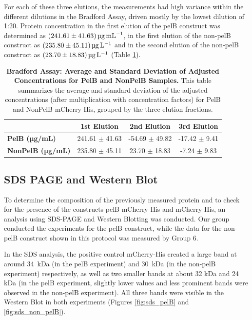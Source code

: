 \documentclass[a4paper,12pt]{article}
\begin{document}
For each of these three elutions, the measurements had high variance within the different dilutions in the Bradford Assay, driven mostly by the lowest dilution of 1:20. Protein concentration in the first elution of the pelB construct was determined as $\SI{241.61\pm 41.63}{\micro\gram\per\milli\liter}$, in the first elution of the non-pelB construct as $\SI{235.80\pm 45.11}{\micro\gram\per\liter}$ and in the second elution of the non-pelB construct as $\SI{23.70 \pm 18.83}{\micro\gram\per\liter}$ (Table \ref{tab:bradford3}).

\begin{table}[h!]
    \centering
    \caption{\textbf{Bradford Assay: Average and Standard Deviation of Adjusted Concentrations for PelB and NonPelB Samples.} This table summarizes the average and standard deviation of the adjusted concentrations (after multiplication with concentration factors) for PelB and NonPelB mCherry-His, grouped by the three elution fractions.}
    \begin{tabular}{lccc}
        & \textbf{1st Elution} & \textbf{2nd Elution} & \textbf{3rd Elution}\\
        \hline
        \textbf{PelB (µg/mL)} & 241.61 $\pm$ 41.63 & -54.69 $\pm$ 49.82 & -17.42 $\pm$ 9.41 \\
        \textbf{NonPelB (µg/mL)} & 235.80 $\pm$ 45.11 & 23.70 $\pm$ 18.83 & -7.24 $\pm$ 9.83  \\
        \hline
    \end{tabular}
    \label{tab:bradford3}
\end{table}

\subsection{SDS PAGE and Western Blot}
To determine the composition of the previously measured protein and to check for the presence of the constructs pelB-mCherry-His and mCherry-His, an analysis using SDS-PAGE and Western Blotting was conducted. Our group conducted the experiments for the pelB construct, while the data for the non-pelB construct shown in this protocol was measured by Group 6.

In the SDS analysis, the positive control mCherry-His created a large band at around 34~kDa (in the pelB experiment) and 30~kDa (in the non-pelB experiment) respectively, as well as two smaller bands at about 32 kDa and 24 kDa (in the pelB experiment, slightly lower values and less prominent bands were observed in the non-pelB experiment). All three bands were visible in the Western Blot in both experiments (Figures \ref{fig:sds_pelB} and \ref{fig:sds_non_pelB}). 
\end{document}
